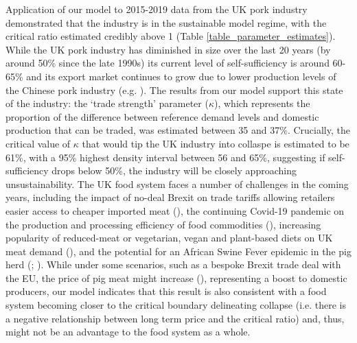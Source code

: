 \documentclass[12pt]{article}
\begin{document}
Application of our model to 2015-2019 data from the UK pork industry demonstrated that the industry is in the sustainable model regime, with the critical ratio estimated credibly above 1 (Table \ref{table_parameter_estimates}). While the UK pork industry has diminished in size over the last 20 years (by around 50\% since the late 1990s) its current level of self-sufficiency is around 60-65\% and its export market continues to grow due to lower production levels of the Chinese pork industry (e.g. \cite{AHDBexports2020}). The results from our model support this state of the industry: the `trade strength' parameter ($\kappa$), which represents the proportion of the difference between reference demand levels and domestic production that can be traded, was estimated between 35 and 37\%. Crucially, the critical value of $\kappa$ that would tip the UK industry into collaspe is estimated to be 61\%, with a 95\% highest density interval between 56 and 65\%, suggesting if self-sufficiency drops below 50\%, the industry will be closely approaching unsustainability. The UK food system faces a number of challenges in the coming years, including the impact of no-deal Brexit on trade tariffs allowing retailers easier access to cheaper imported meat (\cite{feng2017}), the continuing Covid-19 pandemic on the production and processing efficiency of food commodities (\cite{power2020}), increasing popularity of reduced-meat or vegetarian, vegan and plant-based diets on UK meat demand (\cite{james2020}), and the potential for an African Swine Fever epidemic in the pig herd (\cite{normile2019}; \cite{mason2020}). While under some scenarios, such as a bespoke Brexit trade deal with the EU, the price of pig meat might increase (\cite{feng2017}), representing a boost to domestic producers, our model indicates that this result is also consistent with a food system becoming closer to the critical boundary delineating collapse (i.e. there is a negative relationship between long term price and the critical ratio) and, thus, might not be an advantage to the food system as a whole.
\end{document}
